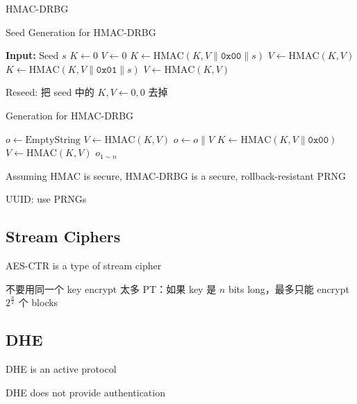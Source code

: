 \documentclass[9pt,landscape]{article}
\begin{document}
\begin{multicols}{2}
HMAC-DRBG

\begin{minipage}{\linewidth}
    \begin{algorithm}[H]
    \caption{Seed Generation for HMAC-DRBG}
    \begin{algorithmic}[1]
    \State \textbf{Input:} Seed $s$
    \State $K \gets 0$
    \State $V \gets 0$
    \State $K \gets \text{HMAC}(K, V \| \mathtt{0x00} \| s)$
    \State $V \gets \text{HMAC}(K, V)$
    \State $K \gets \text{HMAC}(K, V \| \mathtt{0x01} \| s)$
    \State $V \gets \text{HMAC}(K, V)$
    \end{algorithmic}
    \end{algorithm}
\end{minipage}

Reseed: 把 seed 中的 $K, V\gets 0, 0$ 去掉

\begin{minipage}{\linewidth}
    \begin{algorithm}[H]
    \caption{Generation for HMAC-DRBG}
    \begin{algorithmic}[1]
    \State $o\gets\mathrm{EmptyString}$
        \State $V \gets \mathrm{HMAC}(K, V)$
        \State $o \gets o \| V$
    \EndWhile
    \State $K \gets \mathrm{HMAC}(K, V \| \mathtt{0x00})$
    \State $V \gets \mathrm{HMAC}(K, V)$
    \State \Return $o_{1\sim n}$
    \end{algorithmic}
    \end{algorithm}
\end{minipage}

Assuming HMAC is secure, HMAC-DRBG is a secure, rollback-resistant PRNG

UUID: use PRNGs

\subsection{Stream Ciphers}

AES-CTR is a type of stream cipher

不要用同一个 key encrypt 太多 PT：如果 key 是 $n$ bits long，最多只能 encrypt $2^{\frac{n}{2}}$ 个 blocks

\subsection{DHE}

DHE is an active protocol

DHE does not provide authentication


\end{multicols}
\end{document}
